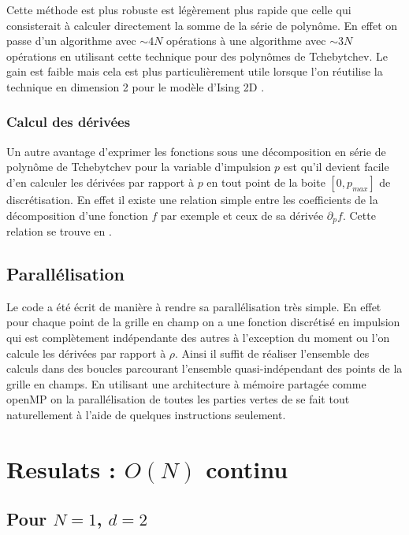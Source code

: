 \documentclass[10pt]{article}
\begin{document}
\begin{multicols}{2}
Cette méthode \cite{clenshaw1955note} est plus robuste est légèrement plus rapide que celle qui consisterait à calculer directement la somme de la série de polynôme. En effet on passe d'un algorithme avec $\sim 4N$ opérations à une algorithme avec $\sim 3N$ opérations en utilisant cette technique pour des polynômes de Tchebytchev. Le gain est faible mais cela est plus particulièrement utile lorsque l'on réutilise la technique en dimension 2 pour le modèle d'Ising 2D .



\subsubsection{Calcul des dérivées}

Un autre avantage d'exprimer les fonctions sous une décomposition en série de polynôme de Tchebytchev pour la variable d'impulsion $p$ est qu'il devient facile d'en calculer les dérivées par rapport à $p$ en tout point de la boite $[0, p_{max}]$ de discrétisation. En effet il existe une relation simple entre les coefficients de la décomposition d'une fonction $f$ par exemple et ceux de sa dérivée $\partial_p f$. Cette relation se trouve en . \\


\subsection{Parallélisation}


Le code a été écrit de manière à rendre sa parallélisation très simple. En effet pour chaque point de la grille en champ on a une fonction discrétisé en impulsion qui est complètement indépendante des autres à l'exception du moment ou l'on calcule les dérivées par rapport à $\rho$. Ainsi il suffit de réaliser l'ensemble des calculs dans des boucles parcourant l'ensemble quasi-indépendant des points de la grille en champs. En utilisant une architecture à mémoire partagée comme openMP on la parallélisation de toutes les parties vertes de  se fait tout naturellement à l'aide de quelques instructions seulement. 



\section{Resulats : $O(N)$ continu}

\subsection{Pour $N = 1$, $d=2$}


\end{multicols}
\end{document}
